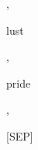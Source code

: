 \documentclass[varwidth=150mm]{standalone}
\begin{document}
\begin{CJK*}{UTF8}{gbsn}
{{{\colorbox{red!1.344571828842163}{\strut ,} \colorbox{red!19.590572357177734}{\strut lust} \colorbox{red!2.5239710807800293}{\strut ,} \colorbox{red!9.239665985107422}{\strut pride} \colorbox{red!30.881954193115234}{\strut ,} \colorbox{red!4.00679349899292}{\strut [SEP]}
}}}
\end{CJK*}
\end{document}
